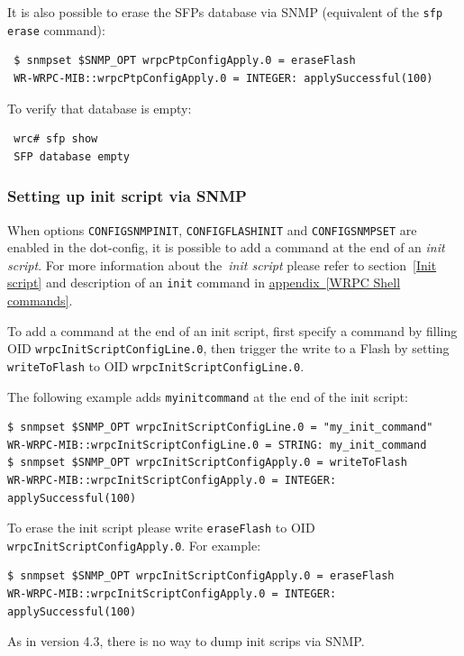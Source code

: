 \documentclass[a4paper, 12pt]{article}
\renewcommand{\_}{\underscore\allowbreak}
\begin{document}
It is also possible to erase the SFPs database via SNMP (equivalent of
the \texttt{sfp erase} command):
\begin{lstlisting}
 $ snmpset $SNMP_OPT wrpcPtpConfigApply.0 = eraseFlash
 WR-WRPC-MIB::wrpcPtpConfigApply.0 = INTEGER: applySuccessful(100)
\end{lstlisting}

To verify that database is empty:
\begin{lstlisting}
 wrc# sfp show
 SFP database empty
\end{lstlisting}

\subsubsection{Setting up init script via SNMP}
\label{Setting up init script via SNMP}

When options \texttt{CONFIG\_SNMP\_INIT}, \texttt{CONFIG\_FLASH\_INIT}
and \texttt{CONFIG\_SNMP\_SET} are enabled in the dot-config, it is possible to
add a command at the end of an \textit{init script}. For more information about
the~\textit{init script} please refer to section~\ref{Init script} and
description of an \texttt{init} command in
\hyperlink{cmd init add}{appendix~\ref{WRPC Shell commands}}.

To add a command at the end of an init script, first specify a command by
filling OID \texttt{wrpcInitScriptConfigLine.0}, then trigger the write to
a Flash by setting \texttt{writeToFlash} to
OID \texttt{wrpcInitScriptConfigLine.0}.

The following example adds \texttt{my\_init\_command} at the end of
the init script:
\begin{lstlisting}
$ snmpset $SNMP_OPT wrpcInitScriptConfigLine.0 = "my_init_command"
WR-WRPC-MIB::wrpcInitScriptConfigLine.0 = STRING: my_init_command
$ snmpset $SNMP_OPT wrpcInitScriptConfigApply.0 = writeToFlash
WR-WRPC-MIB::wrpcInitScriptConfigApply.0 = INTEGER: applySuccessful(100)
\end{lstlisting}

To erase the init script please write \texttt{eraseFlash} to
OID \texttt{wrpcInitScriptConfigApply.0}. For example:
\begin{lstlisting}
$ snmpset $SNMP_OPT wrpcInitScriptConfigApply.0 = eraseFlash
WR-WRPC-MIB::wrpcInitScriptConfigApply.0 = INTEGER: applySuccessful(100)
\end{lstlisting}
As in version 4.3, there is no way to dump init scrips via SNMP.
\end{document}
